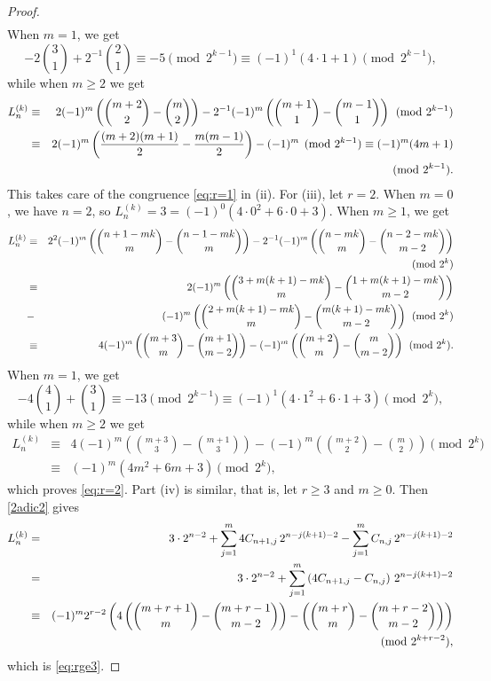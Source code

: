 \documentclass[10pt,a4paper]{amsart}
\begin{document}
\begin{proof}
\begin{eqnarray*}
\end{eqnarray*}
When $m=1$, we get 
$$
-2\binom{3}{1}+2^{-1}\binom{2}{1}\equiv -5\pmod {2^{k-1}}\equiv (-1)^1(4\cdot 1+1)\pmod {2^{k-1}},
$$
while when $m\ge 2$ we get
\begin{eqnarray*}
L_n^{(k)} & \equiv &  2(-1)^m \left(\binom{m+2}{2}-\binom{m}{2}\right)-2^{-1}(-1)^m\left(\binom{m+1}{1}-\binom{m-1}{1}\right)\pmod {2^{k-1}}\\
& \equiv &   2(-1)^m \left(\frac{(m+2)(m+1)}{2}-\frac{m(m-1)}{2}\right)-(-1)^m\pmod {2^{k-1}}\equiv (-1)^m(4m+1)\\
&~&\hfill\pmod {2^{k-1}}.
\end{eqnarray*}
This takes care of the congruence \eqref{eq:r=1} in (ii). For (iii), let $r=2$. When $m=0$, we have $n=2$, so $L_n^{(k)}=3=(-1)^0(4\cdot 0^2+6\cdot 0+3)$. When $m\ge 1$, we get
\begin{eqnarray*}
L_n^{(k)} & \equiv & 2^2(-1)^m \left(\binom{n+1-mk}{m}-\binom{n-1-mk}{m}\right)-2^{-1}(-1)^m \left(\binom{n-mk}{m}-\binom{n-2-mk}{m-2}\right)\\
&~&\hfill\pmod {2^{k}}\\
& \equiv &  
2(-1)^m \left(\binom{3+m(k+1)-mk}{m}-\binom{1+m(k+1)-mk}{m-2}\right)\\ 
& -& (-1)^m \left(\binom{2+m(k+1)-mk}{m}-\binom{m(k+1)-mk}{m-2}\right)\pmod {2^{k}}\\
& \equiv &  
4(-1)^m \left(\binom{m+3}{m}-\binom{m+1}{m-2}\right)-(-1)^m\left(\binom{m+2}{m}-\binom{m}{m-2}\right)\pmod {2^{k}}.\\
\end{eqnarray*}
When $m=1$, we get 
$$
-4\binom{4}{1}+\binom{3}{1}\equiv -13\pmod {2^{k-1}}\equiv (-1)^1(4\cdot 1^2+6\cdot 1+3)\pmod {2^{k}},
$$
while when $m\ge 2$ we get
\begin{eqnarray*}
L_n^{(k)} & \equiv &  4(-1)^m \left(\binom{m+3}{3}-\binom{m+1}{3}\right)-(-1)^m\left(\binom{m+2}{2}-\binom{m}{2}\right)\pmod {2^{k}}\\
& \equiv &  
(-1)^m(4m^2+6m+3)\pmod {2^{k}},
\end{eqnarray*}
which proves \eqref{eq:r=2}.
Part (iv) is similar, that is, let $r\ge 3$ and $m\ge 0$. Then \eqref{2adic2} gives
\begin{eqnarray*}
	L_n^{(k)} & = & 3\cdot2^{n-2}+
	\sum_{j = 1}^{m}4 C_{n+1, j} \, 2^{n - j(k+1) -2}
	- \sum_{j = 1}^{m} C_{n, j} \, 2^{n - j(k+1) - 2}\\
	& = & 3\cdot2^{n-2}+
	\sum_{j = 1}^{m}\left(4 C_{n+1, j}-C_{n, j}\right) \, 2^{n - j(k+1) -2}\\
	&\equiv & (-1)^m 2^{r-2} \left(4\left(\binom{m+r+1}{m}-\binom{m+r-1}{m-2}\right)-\left(\binom{m+r}{m}-\binom{m+r-2}{m-2}\right)\right)\\
	&~&\hfill\pmod {2^{k+r-2}},
\end{eqnarray*}
which is \eqref{eq:rge3}.
\end{proof}
\end{document}
